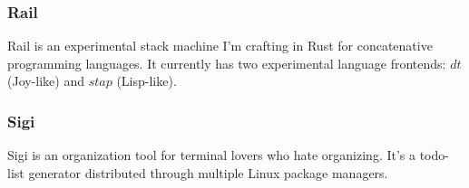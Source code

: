 \documentclass{article}
\begin{document}
\subsubsection{Rail}
Rail is an experimental stack machine I'm crafting in Rust for concatenative
programming languages. It currently has two experimental language frontends:
$dt$ (Joy-like) and $stap$ (Lisp-like).

\subsubsection{Sigi}
Sigi is an organization tool for terminal lovers who hate organizing. It's a
todo-list generator distributed through multiple Linux package managers.
\end{document}
